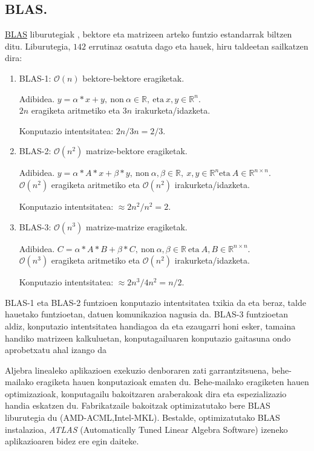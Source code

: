 \subsection*{BLAS.}

\href{http://www.netlib.org/blas}{BLAS} liburutegiak \cite{Intel2015}, bektore eta matrizeen arteko funtzio estandarrak biltzen ditu. Liburutegia, $142$ errutinaz osatuta dago eta hauek, hiru taldeetan sailkatzen dira: 
\begin{enumerate}
\item BLAS-1: $\mathcal{O}(n)$ bektore-bektore eragiketak.

 Adibidea.
 $y=\alpha*x+y, \ \text{non} \ \alpha \in \mathbb{R}, \ \text{eta} \  x,y \in \mathbb{R}^n$. \\
 $2n$ eragiketa aritmetiko eta $3n$ irakurketa/idazketa.
 
 Konputazio intentsitatea: $2n/3n=2/3$. 

\item BLAS-2: $\mathcal{O}(n^2)$ matrize-bektore eragiketak.

 Adibidea.
 $y=\alpha*A*x+\beta*y, \ \text{non} \ \alpha,\beta \in \mathbb{R},\ x,y \in \mathbb{R}^n \text{eta} \ A \in \mathbb{R}^{n \times n}$. \\ 
 $\mathcal{O}(n^2)$ eragiketa aritmetiko eta $\mathcal{O}(n^2)$ irakurketa/idazketa.
 
 Konputazio intentsitatea: $\approx {2n^2}/{n^2}=2$. 
 
\item BLAS-3: $\mathcal{O}(n^3)$ matrize-matrize eragiketak.

 Adibidea.
 $C=\alpha*A*B+\beta*C, \ \text{non} \ \alpha,\beta \in \mathbb{R} \ \text{eta} \ A,B \in \mathbb{R}^{n \times n}$. \\ 
 $\mathcal{O}(n^3)$ eragiketa aritmetiko eta $\mathcal{O}(n^2)$ irakurketa/idazketa.
 
 Konputazio intentsitatea: $\approx {2n^3}/{4n^2}={n}/{2}$. 

\end{enumerate}

BLAS-1 eta BLAS-2 funtzioen konputazio intentsitatea txikia da eta beraz, talde hauetako funtzioetan, datuen komunikazioa nagusia da. BLAS-3 funtzioetan aldiz, konputazio intentsitatea handiagoa da eta ezaugarri honi esker, tamaina handiko matrizeen kalkuluetan, konputagailuaren konputazio gaitasuna ondo aprobetxatu ahal izango da 

Aljebra linealeko aplikazioen exekuzio denboraren zati garrantzitsuena, behe-mailako eragiketa hauen konputazioak ematen du. Behe-mailako eragiketen hauen optimizazioak, konputagailu bakoitzaren araberakoak dira eta espezializazio handia eskatzen du. Fabrikatzaile bakoitzak optimizatutako bere BLAS liburutegia du (AMD-ACML,Intel-MKL). Bestalde, optimizatutako BLAS instalazioa, \emph{ATLAS} (Automatically Tuned Linear Algebra Software) izeneko aplikazioaren bidez ere egin daiteke. 

